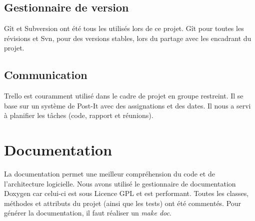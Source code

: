 \subsection{Gestionnaire de version}
Gît et Subversion ont été tous les utilisés lors de ce projet. Gît pour toutes les révisions et 
Svn, pour des versions stables, lors du partage avec les encadrant du projet.
\subsection{Communication}
Trello est couramment utilisé dans le cadre de projet en groupe restreint. Il se base sur un système
de Post-It avec des assignations et des dates.
Il nous a servi à planifier les tâches (code, rapport et réunions).


\section{Documentation}
La documentation permet une meilleur compréhension du code et de l'architecture logicielle.
Nous avons utilisé le gestionnaire de documentation Doxygen car celui-ci est sous Licence GPL
et est performant. Toutes les classes, méthodes et attributs du projet (ainsi que les tests) ont été commentés.
Pour générer la documentation, il faut réaliser un \emph{make doc}.


